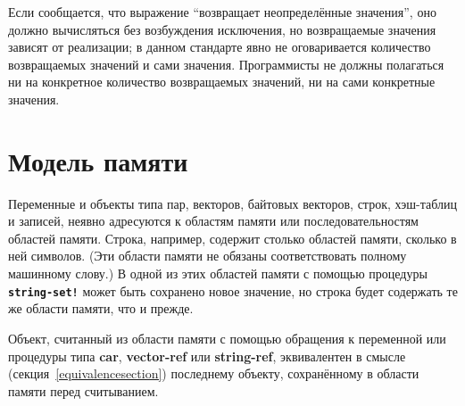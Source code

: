 \vest Если сообщается, что выражение ``возвращает неопределённые значения'', оно должно
вычисляться без возбуждения исключения, но возвращаемые значения зависят от реализации; в данном
стандарте явно не оговаривается количество возвращаемых значений и сами значения. Программисты не
должны полагаться ни на конкретное количество возвращаемых значений, ни на сами конкретные
значения. \vspace{-1.2mm}

\section{Модель памяти}\vspace{-1.2mm}
\label{storagemodel}

Переменные и объекты типа пар, векторов, байтовых векторов, строк, хэш-таблиц и записей, неявно
адресуются к областям памяти или последовательностям областей
памяти. Строка, например, содержит столько областей памяти, сколько в ней символов. (Эти
области памяти не обязаны соответствовать полному машинному слову.) В одной из этих областей
памяти с помощью процедуры {\bfseries\tt string-set!} может быть сохранено новое значение, но
строка будет содержать те же области памяти, что и прежде.

Объект, считанный из области памяти с помощью обращения к переменной или процедуры типа {\bfseries\cf
  car}, {\bfseries\cf vector-ref} или {\bfseries\cf string-ref}, эквивалентен в смысле
\textbf{} (секция~\ref{equivalencesection}) последнему объекту, сохранённому в области памяти перед
считыванием.

